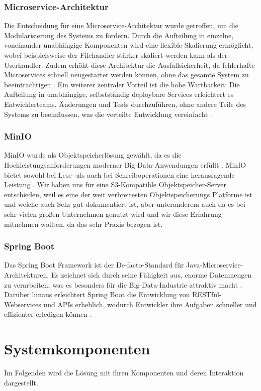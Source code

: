 \documentclass[12pt]{report}
\begin{document}
			\subsubsection{Microservice-Architektur}
			Die Entscheidung für eine Microservice-Architektur wurde getroffen, um die Modularisierung des Systems zu fördern. Durch die Aufteilung in einzelne, voneinander unabhängige Komponenten wird eine flexible Skalierung ermöglicht, wobei beispielsweise der Filehandler stärker skaliert werden kann als der Userhandler. Zudem erhöht diese Architektur die Ausfallsicherheit, da fehlerhafte Microservices schnell neugestartet werden können, ohne das gesamte System zu beeinträchtigen \cite{taibi2017processes}. Ein weiterer zentraler Vorteil ist die hohe Wartbarkeit: Die Aufteilung in unabhängige, selbstständig deploybare Services erleichtert es Entwicklerteams, Änderungen und Tests durchzuführen, ohne andere Teile des Systems zu beeinflussen, was die verteilte Entwicklung vereinfacht \cite{de2019monolithic}.
			
			\subsubsection{MinIO}
			MinIO wurde als Objektspeicherlösung gewählt, da es die Hochleistungsanforderungen moderner Big-Data-Anwendungen erfüllt \cite{makris2022performiance}. MinIO bietet sowohl bei Lese- als auch bei Schreiboperationen eine herausragende Leistung \cite{makris2022performance}. Wir haben uns für eine S3-Kompatible Objektspeicher-Server entschieden, weil es eine der weit verbreitesten Objektspeicherungs Platforme ist und welche auch Sehr gut dokumentiert ist, aber unteranderem auch da es bei sehr vielen großen Unternehmen genutzt wird und wir diese Erfahrung mitnehmen wollten, da das sehr Praxis bezogen ist.
			
			\subsubsection{Spring Boot}
			Das Spring Boot Framework ist der De-facto-Standard für Java-Microservice-Architekturen. Es zeichnet sich durch seine Fähigkeit aus, enorme Datenmengen zu verarbeiten, was es besonders für die Big-Data-Industrie attraktiv macht \cite{mythily2022analysis}. Darüber hinaus erleichtert Spring Boot die Entwicklung von RESTful-Webservices und APIs erheblich, wodurch Entwickler ihre Aufgaben schneller und effizienter erledigen können \cite{mythily2022analysis}.
			
	\section{Systemkomponenten}
		Im Folgenden wird die Lösung mit ihren Komponenten und deren Interaktion dargestellt.
\end{document}
